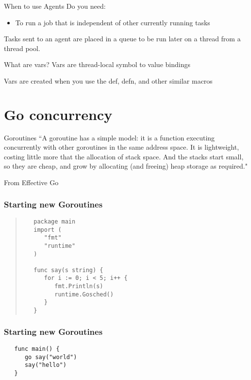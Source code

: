 \documentclass[xcolor=dvipsnames]{beamer}
\begin{document}
	\begin{frame}{When to use Agents}
		Do you need:
		\begin{itemize}
		\item To run a job that is independent of other currently running tasks
		\end{itemize}
		Tasks sent to an agent are placed in a queue to be run later on a thread from a thread pool.
	\end{frame}
	
	\begin{frame}{What are vars?}
		Vars are thread-local symbol to value bindings
		
		Vars are created when you use the def, defn, and other similar macros
	\end{frame}
	
\section{Go concurrency}

	\begin{frame}{Goroutines}
	``A goroutine has a simple model: it is a function executing concurrently with other goroutines in the same address space. It is lightweight, costing little more that the allocation of stack space. And the stacks start small, so they are cheap, and grow by allocating (and freeing) heap storage as required."
	
	\hspace{10 mm} From Effective Go
	\end{frame}
	
	
	\begin{frame}[fragile]
	\frametitle{Starting new Goroutines}
	\begin{quote}	
	\begin{verbatim}
   package main
   import (
      "fmt"
      "runtime"
   )

   func say(s string) {
      for i := 0; i < 5; i++ {
         fmt.Println(s)
         runtime.Gosched()
      }
   }
	\end{verbatim}
	\end{quote}
	\end{frame}
	
	\begin{frame}[fragile]
	\frametitle{Starting new Goroutines}
	\begin{verbatim}
   func main() {
      go say("world")
      say("hello")
   }
	\end{verbatim}
	\end{frame}
	
\end{document}
